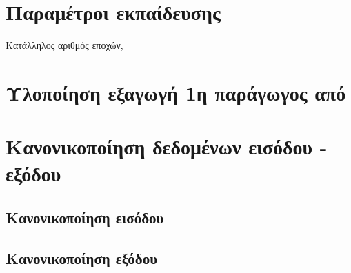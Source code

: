 \section{Παραμέτροι εκπαίδευσης}
Κατάλληλος αριθμός εποχών, 

\section{Υλοποίηση εξαγωγή  1η παράγωγος από }

\section{Κανονικοποίηση δεδομένων εισόδου - εξόδου}

\subsection{Κανονικοποίηση εισόδου}

\subsection{Κανονικοποίηση εξόδου}
